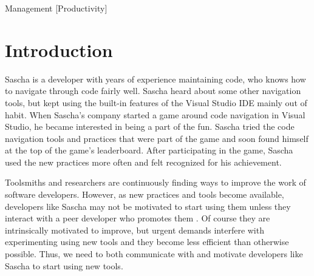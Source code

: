 \documentclass{sig-alternate}
\begin{document}
 {Management} [Productivity]



\section{Introduction}

Sascha is a developer with years of experience maintaining code, who knows how to navigate through code fairly well.  Sascha heard about some other navigation tools, but kept using the built-in features of the Visual Studio IDE mainly out of habit.  When Sascha's company started a game around code navigation in Visual Studio, he became interested in being a part of the fun.  Sascha tried the code navigation tools and practices that were part of the game and soon found himself at the top of the game's leaderboard.  After participating in the game, Sascha used the new practices more often and felt recognized for his achievement.

Toolsmiths and researchers are continuously finding ways to improve the work of software developers.  However, as new practices and tools become available, developers like Sascha may not be motivated to start using them unless they interact with a peer developer who promotes them \cite{wbsnipes:Hill2011Peer}.    Of course they are intrinsically motivated to improve, but urgent demands interfere with experimenting using new tools and they become less efficient than otherwise possible.  Thus, we need to both communicate with and motivate developers like Sascha to start using new tools.

\end{document}
